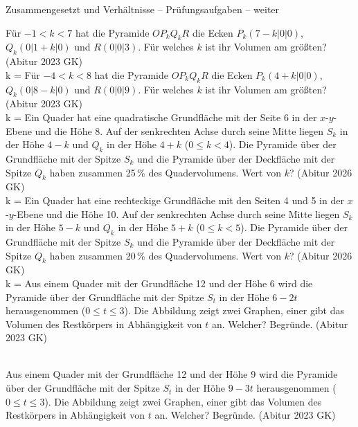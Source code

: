 \begin{aufgabe}{Zusammengesetzt und Verhältnisse – Prüfungsaufgaben – weiter}
\begin{teile}
\teil Für $-1 < k < 7$ hat die Pyramide $OP_kQ_kR$ die Ecken $P_k(7 - k | 0 | 0)$, $Q_k(0 | 1 + k | 0)$ und $R(0 | 0 | 3)$. Für welches $k$ ist ihr Volumen am größten? \hfill (Abitur 2023 GK) \\ k = \leerfeld
\teil Für $-4 < k < 8$ hat die Pyramide $OP_kQ_kR$ die Ecken $P_k(4 + k | 0 | 0)$, $Q_k(0 | 8 - k | 0)$ und $R(0 | 0 | 9)$. Für welches $k$ ist ihr Volumen am größten? \hfill (Abitur 2023 GK) \\ k = \leerfeld
\teil Ein Quader hat eine quadratische Grundfläche mit der Seite 6 in der $x$-$y$-Ebene und die Höhe 8. Auf der senkrechten Achse durch seine Mitte liegen $S_k$ in der Höhe $4 - k$ und $Q_k$ in der Höhe $4 + k$ ($0 \le k < 4$). Die Pyramide über der Grundfläche mit der Spitze $S_k$ und die Pyramide über der Deckfläche mit der Spitze $Q_k$ haben zusammen 25\,\% des Quadervolumens. Wert von $k$? \hfill (Abitur 2026 GK) \\ k = \leerfeld
\teil Ein Quader hat eine rechteckige Grundfläche mit den Seiten 4 und 5 in der $x$-$y$-Ebene und die Höhe 10. Auf der senkrechten Achse durch seine Mitte liegen $S_k$ in der Höhe $5 - k$ und $Q_k$ in der Höhe $5 + k$ ($0 \le k < 5$). Die Pyramide über der Grundfläche mit der Spitze $S_k$ und die Pyramide über der Deckfläche mit der Spitze $Q_k$ haben zusammen 20\,\% des Quadervolumens. Wert von $k$? \hfill (Abitur 2026 GK) \\ k = \leerfeld
\teil Aus einem Quader mit der Grundfläche 12 und der Höhe 6 wird die Pyramide über der Grundfläche mit der Spitze $S_t$ in der Höhe $6 - 2t$ herausgenommen ($0 \le t \le 3$). Die Abbildung zeigt zwei Graphen, einer gibt das Volumen des Restkörpers in Abhängigkeit von $t$ an. Welcher? Begründe. \hfill (Abitur 2023 GK) \\  \\ 

\begin{ksys}[xmin=0,xmax=4,ymin=0,ymax=80,xstep=1,ystep=10,xlabel=t,ylabel=V]   \end{ksys}
\teil Aus einem Quader mit der Grundfläche 12 und der Höhe 9 wird die Pyramide über der Grundfläche mit der Spitze $S_t$ in der Höhe $9 - 3t$ herausgenommen ($0 \le t \le 3$). Die Abbildung zeigt zwei Graphen, einer gibt das Volumen des Restkörpers in Abhängigkeit von $t$ an. Welcher? Begründe. \hfill (Abitur 2023 GK) \\  \\ 

\begin{ksys}[xmin=0,xmax=4,ymin=0,ymax=120,xstep=1,ystep=20,xlabel=t,ylabel=V]   \end{ksys}
\end{teile}
\end{aufgabe}

